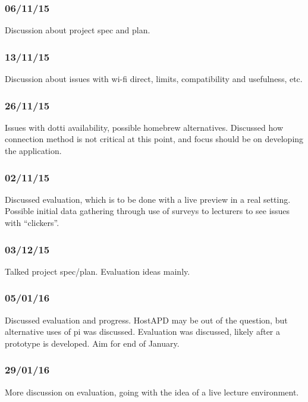 \documentclass{article}
\begin{document}
\subsubsection{06/11/15}
Discussion about project spec and plan.

\subsubsection{13/11/15}
Discussion about issues with wi-fi direct, limits, compatibility and usefulness, etc.

\subsubsection{26/11/15} 
Issues with dotti availability, possible homebrew alternatives. Discussed how connection method is not critical at this point, and focus should be on developing the application.

\subsubsection{02/11/15}
Discussed evaluation, which is to be done with a live preview in a real setting.
Possible initial data gathering through use of surveys to lecturers to see issues with ``clickers''.

\subsubsection{03/12/15}
Talked project spec/plan. Evaluation ideas mainly.

\subsubsection{05/01/16}
Discussed evaluation and progress. HostAPD may be out of the question, but alternative uses of pi was discussed.
Evaluation was discussed, likely after a prototype is developed. Aim for end of January.

\subsubsection{29/01/16}
More discussion on evaluation, going with the idea of a live lecture environment.
\end{document}
